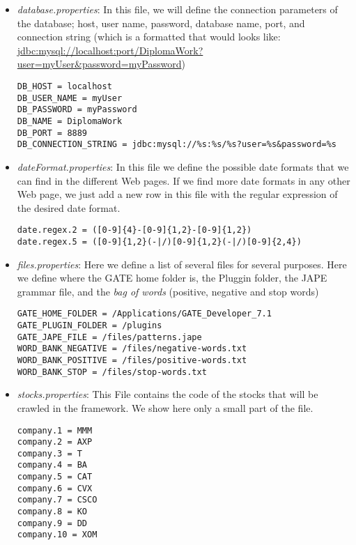 \begin{itemize}
	\item \emph{database.properties}: In this file, we will define the connection parameters of the database; host, user name, password, database name, port, and connection string (which is a formatted that would looks like:  \url{jdbc:mysql://localhost:port/DiplomaWork?user=myUser&password=myPassword})

\begin{lstlisting}
DB_HOST = localhost
DB_USER_NAME = myUser
DB_PASSWORD = myPassword
DB_NAME = DiplomaWork
DB_PORT = 8889
DB_CONNECTION_STRING = jdbc:mysql://%s:%s/%s?user=%s&password=%s
\end{lstlisting}

	\item \emph{dateFormat.properties}: In this file we define the possible date formats that we can find in the different Web pages. If we find more date formats in any other Web page, we just add a new row in this file with the regular expression of the desired date format.
	
\begin{lstlisting}
date.regex.2 = ([0-9]{4}-[0-9]{1,2}-[0-9]{1,2})
date.regex.5 = ([0-9]{1,2}(-|/)[0-9]{1,2}(-|/)[0-9]{2,4})
\end{lstlisting}

	\item \emph{files.properties}: Here we define a list of several files for several purposes. Here we define where the GATE home folder is, the Pluggin folder, the JAPE grammar file, and the \emph{bag of words} (positive, negative and stop words)

\begin{lstlisting}
GATE_HOME_FOLDER = /Applications/GATE_Developer_7.1
GATE_PLUGIN_FOLDER = /plugins
GATE_JAPE_FILE = /files/patterns.jape
WORD_BANK_NEGATIVE = /files/negative-words.txt
WORD_BANK_POSITIVE = /files/positive-words.txt
WORD_BANK_STOP = /files/stop-words.txt
\end{lstlisting}

	\item \emph{stocks.properties}: This File contains the code of the stocks that will be crawled in the framework. We show here only a small part of the file. 
	
\begin{lstlisting}
company.1 = MMM
company.2 = AXP
company.3 = T
company.4 = BA
company.5 = CAT
company.6 = CVX
company.7 = CSCO
company.8 = KO
company.9 = DD
company.10 = XOM
\end{lstlisting}


\end{itemize}
